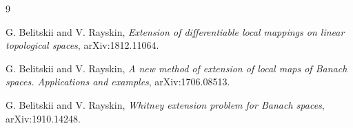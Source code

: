 \documentclass[11pt]{amsart}
\begin{document}
\begin{thebibliography}{9}

G. Belitskii and V. Rayskin,
\emph{Extension of differentiable local mappings on linear topological
spaces},
arXiv:1812.11064.

G. Belitskii and V. Rayskin,
\emph{A new method of extension of local maps of Banach spaces. Applications
and examples},
arXiv:1706.08513.

G. Belitskii and V. Rayskin,
\emph{Whitney extension problem for Banach spaces},
arXiv:1910.14248.

\end{thebibliography}
\end{document}
